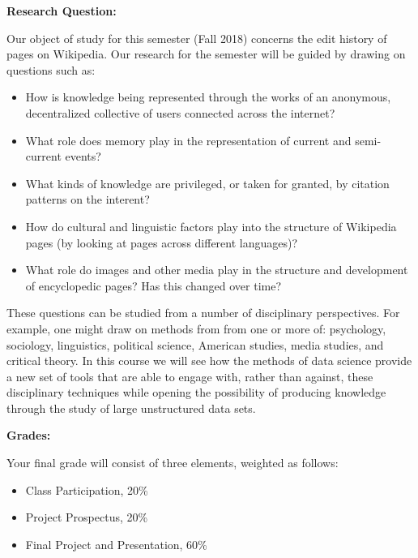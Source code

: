 \documentclass[12pt]{article}
\begin{document}
\textbf{Research Question:} \vspace{6pt}

Our object of study for this semester (Fall 2018) concerns the edit history
of pages on Wikipedia. Our research for the semester will be guided by drawing
on questions such as:

\begin{itemize}\setlength\itemsep{0em}
\item How is knowledge being represented through the works of an anonymous,
decentralized collective of users connected across the internet?
\item What role does memory play in the representation of current and
semi-current events?
\item What kinds of knowledge are privileged, or taken for granted, by
citation patterns on the interent?
\item How do cultural and linguistic factors play into the structure of
Wikipedia pages (by looking at pages across different languages)?
\item What role do images and other media play in the structure and
development of encyclopedic pages? Has this changed over time?
\end{itemize}

These questions can be studied from a number of disciplinary perspectives.
For example, one might draw on methods from from one or more of: psychology,
sociology, linguistics, political science, American studies, media studies,
and critical theory. In this course we will see how the methods of data
science provide a new set of tools that are able to engage with, rather than
against, these disciplinary techniques while opening the possibility of
producing knowledge through the study of large unstructured data sets.

\clearpage

\textbf{Grades:} \vspace{6pt}

Your final grade will consist of three elements, weighted as follows:

\begin{itemize}[noitemsep,topsep=6pt]
\item Class Participation, 20\%
\item Project Prospectus, 20\%
\item Final Project and Presentation, 60\%
\end{itemize}

\vspace{3pt}
\end{document}
